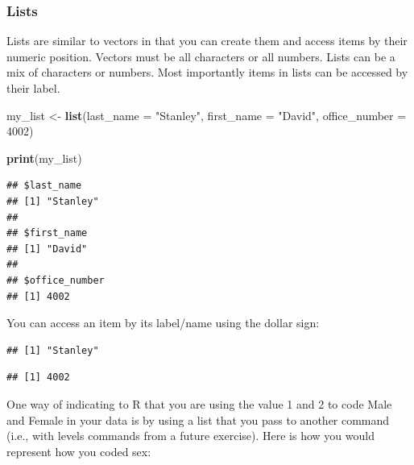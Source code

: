 \documentclass[
]{krantz}
\makeatletter
\newenvironment{Shaded}{\begin{snugshade}}{\end{snugshade}}
\newcommand{\DataTypeTok}[1]{\textcolor[rgb]{0.27,0.27,0.27}{#1}}
\newcommand{\DecValTok}[1]{\textcolor[rgb]{0.06,0.06,0.06}{#1}}
\newcommand{\KeywordTok}[1]{\textcolor[rgb]{0.27,0.27,0.27}{\textbf{#1}}}
\newcommand{\NormalTok}[1]{#1}
\newcommand{\OperatorTok}[1]{\textcolor[rgb]{0.43,0.43,0.43}{\textbf{#1}}}
\newcommand{\StringTok}[1]{\textcolor[rgb]{0.5,0.5,0.5}{#1}}
\newenvironment{kframe}{%
\medskip{}
\setlength{\fboxsep}{.8em}
 \def\at@end@of@kframe{}%
 \ifinner\ifhmode%
  \def\at@end@of@kframe{\end{minipage}}%
  \begin{minipage}{\columnwidth}%
 \fi\fi%
 \def\FrameCommand##1{\hskip\@totalleftmargin \hskip-\fboxsep
 \colorbox{shadecolor}{##1}\hskip-\fboxsep
     \hskip-\linewidth \hskip-\@totalleftmargin \hskip\columnwidth}%
 \MakeFramed {\advance\hsize-\width
   \@totalleftmargin\z@ \linewidth\hsize
   \@setminipage}}%
 {\par\unskip\endMakeFramed%
 \at@end@of@kframe}
\renewenvironment{Shaded}{\begin{kframe}}{\end{kframe}}
\makeatother
\begin{document}
\hypertarget{lists}{%
\subsubsection{Lists}\label{lists}}

Lists are similar to vectors in that you can create them and access items by their numeric position. Vectors must be all characters or all numbers. Lists can be a mix of characters or numbers. Most importantly items in lists can be accessed by their label.

\begin{Shaded}
\begin{Highlighting}[]
\NormalTok{my_list <-}\StringTok{ }\KeywordTok{list}\NormalTok{(}\DataTypeTok{last_name =} \StringTok{"Stanley"}\NormalTok{,}
                \DataTypeTok{first_name =} \StringTok{"David"}\NormalTok{,}
                \DataTypeTok{office_number =} \DecValTok{4002}\NormalTok{)}

\KeywordTok{print}\NormalTok{(my_list)}
\end{Highlighting}
\end{Shaded}

\begin{verbatim}
## $last_name
## [1] "Stanley"
## 
## $first_name
## [1] "David"
## 
## $office_number
## [1] 4002
\end{verbatim}

You can access an item by its label/name using the dollar sign:

\begin{Shaded}
\end{Shaded}

\begin{verbatim}
## [1] "Stanley"
\end{verbatim}

\begin{Shaded}
\end{Shaded}

\begin{verbatim}
## [1] 4002
\end{verbatim}

One way of indicating to R that you are using the value 1 and 2 to code Male and Female in your data is by using a list that you pass to another command (i.e., with levels commands from a future exercise). Here is how you would represent how you coded sex:
\end{document}

